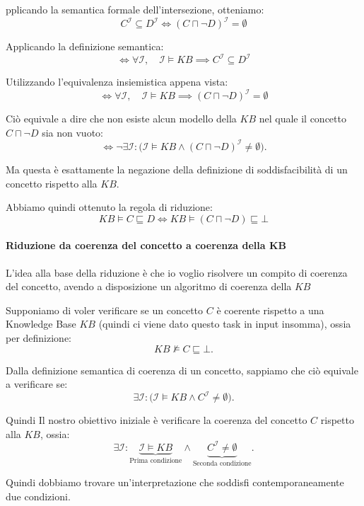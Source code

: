pplicando la semantica formale dell'intersezione, otteniamo:
\[
\boxed{
C^{\mathcal I}\subseteq D^{\mathcal I}
\iff
(C\sqcap\neg D)^{\mathcal I}=\emptyset
}
\]

Applicando la definizione semantica:
\[
\iff
\forall\mathcal I,\quad
\mathcal I\models KB
\implies C^{\mathcal I}\subseteq D^{\mathcal I}
\]

Utilizzando l'equivalenza insiemistica appena vista:
\[
\iff
\forall\mathcal I,\quad
\mathcal I\models KB
\implies(C\sqcap\neg D)^{\mathcal I}=\emptyset
\]

Ciò equivale a dire che non esiste alcun modello della \(KB\) nel quale il concetto \(C\sqcap\neg D\) sia non vuoto:
\[
\iff
\neg\exists\mathcal I:
\bigl(\mathcal I\models KB
\land
(C\sqcap\neg D)^{\mathcal I}\neq\emptyset\bigr).
\]

Ma questa è esattamente la negazione della definizione di soddisfacibilità di un concetto rispetto alla \(KB\).

Abbiamo quindi ottenuto la regola di riduzione:
\[
\boxed{
KB\models C\sqsubseteq D
\iff
KB\models(C\sqcap\neg D)\sqsubseteq\bot
}
\]

\newpage

\paragraph{Riduzione da coerenza del concetto a coerenza della KB}
L'idea alla base della riduzione è che io voglio risolvere un compito di coerenza del concetto, avendo a disposizione un algoritmo di coerenza della $KB$


Supponiamo di voler verificare se un concetto $C$ è coerente
rispetto a una Knowledge Base $KB$ (quindi ci viene dato questo task in input insomma), ossia per definizione:
\[
    KB \not\models C \sqsubseteq \bot.
\]

Dalla definizione semantica di coerenza di un concetto, sappiamo
che ciò equivale a verificare se:
\[
    \exists \mathcal{I} :
    \bigl(\mathcal{I} \models KB
    \land C^{\mathcal{I}} \neq \emptyset\bigr).
\]

Quindi Il nostro obiettivo iniziale è verificare la coerenza del concetto \(C\) rispetto alla \(KB\), ossia:
\[
\exists\mathcal I:
\underbrace{\mathcal I\models KB}_{\text{Prima condizione}}
\land
\underbrace{C^{\mathcal I}\neq\emptyset}_{\text{Seconda condizione}}.
\]

Quindi dobbiamo trovare un'interpretazione che soddisfi contemporaneamente due condizioni.

